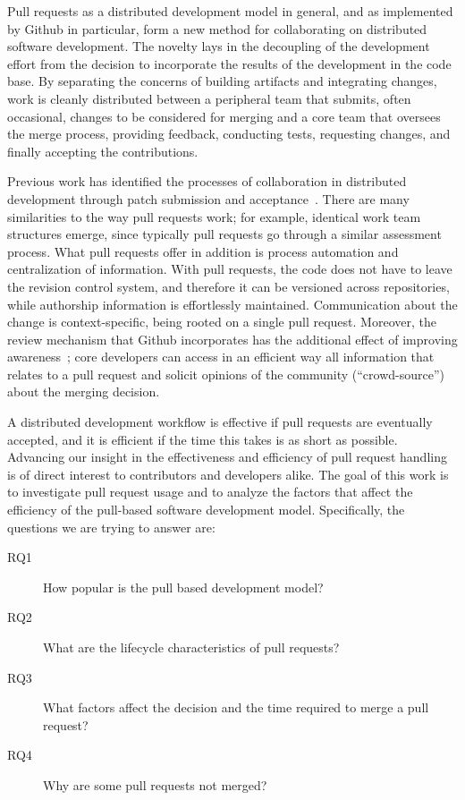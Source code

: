 \documentclass{sig-alternate}
\begin{document}
Pull requests as a distributed development model in general, and as implemented
by Github in particular, form a new method for collaborating on distributed
software development. The novelty lays in the decoupling of the development
effort from the decision to incorporate the results of the development in the
code base. By separating the concerns of building artifacts and integrating
changes, work is cleanly distributed between a peripheral team that submits, often
occasional, changes to be considered for merging and a core team that oversees
the merge process, providing feedback, conducting tests, requesting changes, and
finally accepting the contributions.

Previous work has identified the processes of collaboration in distributed
development through patch submission and acceptance~\cite{MOCKU02, Bird07,
Weiss08}. There are many similarities to the way pull requests work; for
example, identical work team structures emerge, since typically pull requests go
through a similar assessment process. What pull requests offer in addition is
process automation and centralization of information. With pull requests, the
code does not have to leave the revision control system, and therefore it can be
versioned across repositories, while authorship information is effortlessly
maintained. Communication about the change is context-specific, being rooted on
a single pull request. Moreover, the review mechanism that Github incorporates
has the additional effect of improving awareness~\cite{Dabbi12}; core developers
can access in an efficient way all information that relates to a pull request
and solicit opinions of the community (``crowd-source'') about the merging
decision.

A distributed development workflow is effective if pull requests are eventually
accepted, and it is efficient if the time this takes is as short as possible.
Advancing our insight in the effectiveness and efficiency of pull request
handling is of direct interest to contributors and developers alike. The goal
of this work is to investigate pull request usage and to analyze the factors
that affect the efficiency of the pull-based software development model.
Specifically, the questions we are trying to answer are: 

\begin{description}
  
  \item[RQ1] How popular is the pull based development model?

  \item[RQ2] What are the lifecycle characteristics of pull requests?
    
  \item[RQ3] What factors affect the decision and the time required to merge a pull request?

  \item[RQ4] Why are some pull requests not merged?

\end{description}
\end{document}
